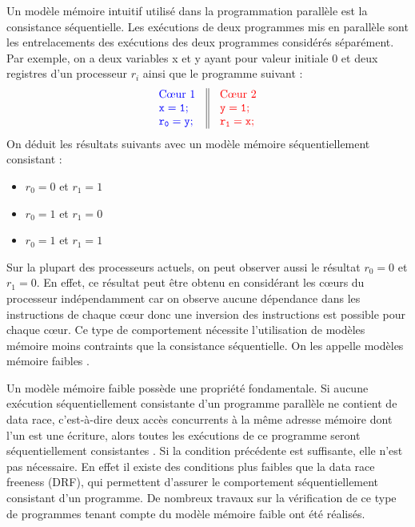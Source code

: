 \documentclass[12pt,a4paper]{article}
\begin{document}
Un modèle mémoire intuitif utilisé dans la programmation parallèle est la consistance séquentielle. Les exécutions de deux programmes mis en parallèle sont les entrelacements des exécutions des deux programmes considérés séparément. Par exemple, on a deux variables x et y ayant pour valeur initiale 0 et deux registres d'un processeur $r_i$ ainsi que le programme suivant :
\[
\begin{array}{c||c}
  \begin{array}{l}
    \textcolor[rgb]{0,0,1}{\text{C\oe{}ur 1}} \\
    \textcolor[rgb]{0,0,1}{\mathtt{x = 1;}} \\
    \textcolor[rgb]{0,0,1}{\mathtt{r_0 = y;}} \\
  \end{array} &
  \begin{array}{l}
    \textcolor[rgb]{1,0,0}{\text{C\oe{}ur 2}} \\
    \textcolor[rgb]{1,0,0}{\mathtt{y = 1;}} \\
    \textcolor[rgb]{1,0,0}{\mathtt{r_1 = x;}} \\
  \end{array}
\end{array}
\]
On déduit les résultats suivants avec un modèle mémoire séquentiellement consistant :
\begin{itemize}
	\item $r_0 = 0$ et $r_1 = 1$
	\item $r_0 = 1$ et $r_1 = 0$
	\item $r_0 = 1$ et $r_1 = 1$
\end{itemize} 
Sur la plupart des processeurs actuels, on peut observer aussi le résultat $r_0 = 0$ et $r_1 = 0$. En effet, ce résultat peut être obtenu en considérant les cœurs du processeur indépendamment car on observe aucune dépendance dans les instructions de chaque cœur donc une inversion des instructions est possible pour chaque cœur. Ce type de comportement nécessite l'utilisation de modèles mémoire moins contraints que la consistance séquentielle. On les appelle modèles mémoire faibles \cite{Adve:1996:SMC:619013.620590}. 

Un modèle mémoire faible possède une propriété fondamentale. Si aucune exécution séquentiellement consistante d'un programme parallèle ne contient de data race, c'est-à-dire deux accès concurrents à la même adresse mémoire dont l'un est une écriture, alors toutes les exécutions de ce programme seront séquentiellement consistantes \cite{Saraswat:2007:TMM:1229428.1229469}.
Si la condition précédente est suffisante, elle n'est pas nécessaire. En effet il existe des conditions plus faibles que la data race freeness (DRF), qui permettent d'assurer le comportement séquentiellement consistant d'un programme\cite{Owens:2010:RIC:1883978.1884011}. De nombreux travaux sur la vérification de ce type de programmes tenant compte du modèle mémoire faible ont été réalisés\cite{Turon:2014:GNW:2714064.2660243}.
\end{document}
